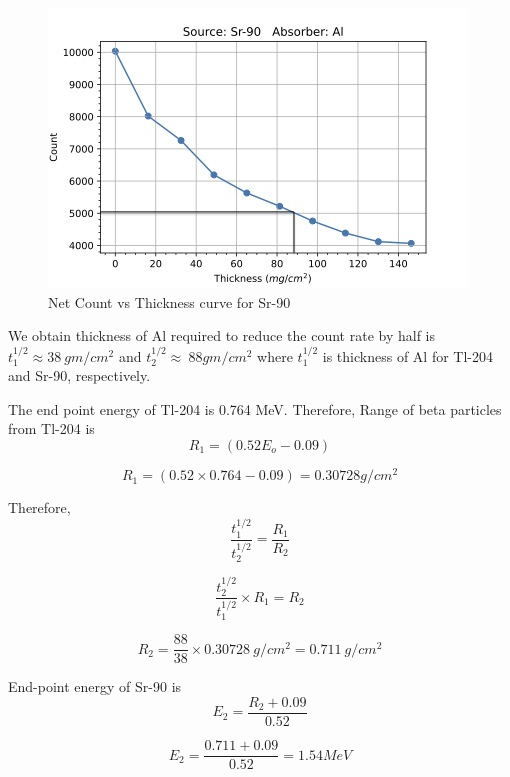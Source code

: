 \documentclass[a4paper, amsfonts, amssymb, amsmath, reprint, showkeys, nofootinbib, twoside]{revtex4-1}
\begin{document}
\begin{figure}[H]
	\centering
	\includegraphics[scale=0.6]{2sr} 
	\caption{Net Count vs Thickness curve for Sr-90}
	\label{2}
\end{figure}

We obtain thickness of Al required to reduce the count rate by half is $t_1^{1/2}\approx38~gm/cm^2$ and $t_2^{1/2}\approx~88gm/cm^2$ where $t_1^{1/2}$ is thickness of Al for Tl-204 and Sr-90, respectively.

The end point energy of Tl-204 is 0.764 MeV. Therefore, Range of beta particles from Tl-204 is 
\begin{equation}
	R_1=(0.52E_o-0.09)
\end{equation}

\begin{equation}
	R_1=(0.52\times0.764-0.09)=0.30728 g/cm^2
\end{equation}

Therefore,
\begin{equation}
	\frac{t_1^{1/2}}{t_2^{1/2}}=\frac{R_1}{R_2}
\end{equation}

\begin{equation}
	\frac{t_2^{1/2}}{t_1^{1/2}}\times R_1=R_2
\end{equation}

\begin{equation}
	R_2=\frac{88}{38}\times 0.30728 ~g/cm^2=0.711~g/cm^2
\end{equation}

End-point energy of Sr-90 is
\begin{equation}
	E_2=\frac{R_2+0.09}{0.52}
\end{equation}

\begin{equation}
	E_2=\frac{0.711+0.09}{0.52}=1.54 MeV
\end{equation}
\end{document}
